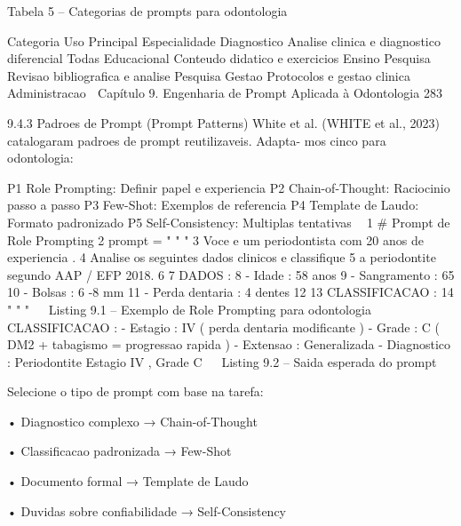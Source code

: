                    Tabela 5 – Categorias de prompts para odontologia

           Categoria      Uso Principal                               Especialidade
           Diagnostico    Analise clinica e diagnostico diferencial   Todas
           Educacional    Conteudo didatico e exercicios              Ensino
           Pesquisa       Revisao bibliografica e analise             Pesquisa
           Gestao         Protocolos e gestao clinica                 Administracao
  Capítulo 9. Engenharia de Prompt Aplicada à Odontologia                           283


  9.4.3     Padroes de Prompt (Prompt Patterns)
  White et al. (WHITE et al., 2023) catalogaram padroes de prompt reutilizaveis. Adapta-
  mos cinco para odontologia:

     P1 Role Prompting: Definir papel e experiencia
     P2 Chain-of-Thought: Raciocinio passo a passo
     P3 Few-Shot: Exemplos de referencia
     P4 Template de Laudo: Formato padronizado
     P5 Self-Consistency: Multiplas tentativas
                                                                                          
 1 # Prompt de Role Prompting
 2 prompt = " " "
 3 Voce e um periodontista com 20 anos de experiencia .
 4 Analise os seguintes dados clinicos e classifique
 5 a periodontite segundo AAP / EFP 2018.
 6
 7 DADOS :
 8 - Idade : 58 anos
 9 - Sangramento : 65%
10 - Bolsas : 6 -8 mm
11 - Perda dentaria : 4 dentes
12
13 CLASSIFICACAO :
14 " " "
                                                                                          
                 Listing 9.1 – Exemplo de Role Prompting para odontologia
                                                                                          
  CLASSIFICACAO :
  - Estagio : IV ( perda dentaria modificante )
  - Grade : C ( DM2 + tabagismo = progressao rapida )
  - Extensao : Generalizada
  - Diagnostico : Periodontite Estagio IV , Grade C
                                                                                          
                           Listing 9.2 – Saida esperada do prompt


      Selecione o tipo de prompt com base na tarefa:

          • Diagnostico complexo → Chain-of-Thought

          • Classificacao padronizada → Few-Shot

          • Documento formal → Template de Laudo

          • Duvidas sobre confiabilidade → Self-Consistency



